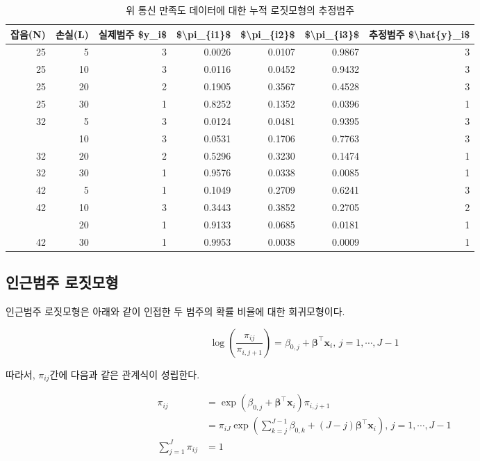 \documentclass[]{book}
\begin{document}
\begin{table}[t]

\caption{\label{tab:cumulative-logit-prediction}위 통신 만족도 데이터에 대한 누적 로짓모형의 추정범주}
\centering
\begin{tabular}{rrrrrrr}
\toprule
잡음(N) & 손실(L) & 실제범주 \$y\_i\$ & \$\textbackslash{}pi\_\{i1\}\$ & \$\textbackslash{}pi\_\{i2\}\$ & \$\textbackslash{}pi\_\{i3\}\$ & 추정범주 \$\textbackslash{}hat\{y\}\_i\$\\
\midrule
25 & 5 & 3 & 0.0026 & 0.0107 & 0.9867 & 3\\
25 & 10 & 3 & 0.0116 & 0.0452 & 0.9432 & 3\\
25 & 20 & 2 & 0.1905 & 0.3567 & 0.4528 & 3\\
25 & 30 & 1 & 0.8252 & 0.1352 & 0.0396 & 1\\
32 & 5 & 3 & 0.0124 & 0.0481 & 0.9395 & 3\\
\addlinespace
32 & 10 & 3 & 0.0531 & 0.1706 & 0.7763 & 3\\
32 & 20 & 2 & 0.5296 & 0.3230 & 0.1474 & 1\\
32 & 30 & 1 & 0.9576 & 0.0338 & 0.0085 & 1\\
42 & 5 & 1 & 0.1049 & 0.2709 & 0.6241 & 3\\
42 & 10 & 3 & 0.3443 & 0.3852 & 0.2705 & 2\\
\addlinespace
42 & 20 & 1 & 0.9133 & 0.0685 & 0.0181 & 1\\
42 & 30 & 1 & 0.9953 & 0.0038 & 0.0009 & 1\\
\bottomrule
\end{tabular}
\end{table}

\hypertarget{adjacent-categories-logit-model}{%
\subsection{인근범주 로짓모형}\label{adjacent-categories-logit-model}}

인근범주 로짓모형은 아래와 같이 인접한 두 범주의 확률 비율에 대한 회귀모형이다.

\begin{equation}
\log \left( \frac{\pi_{ij}}{\pi_{i,j+1}} \right) = \beta_{0,j} + \boldsymbol\beta^\top \mathbf{x}_i, \, j = 1, \cdots, J - 1
\label{eq:adjacent-category-logit}
\end{equation}

따라서, \(\pi_{ij}\)간에 다음과 같은 관계식이 성립한다.

\begin{equation*}
\begin{split}
\pi_{ij} &= \exp (\beta_{0,j} + \boldsymbol\beta^\top \mathbf{x}_i) \pi_{i,j+1}\\
&= \pi_{iJ} \exp \left(\sum_{k = j}^{J - 1} \beta_{0,k} + (J - j) \boldsymbol\beta^\top \mathbf{x}_i\right), \, j = 1, \cdots, J-1\\
\sum_{j = 1}^{J} \pi_{ij} &= 1
\end{split}
\end{equation*}
\end{document}
